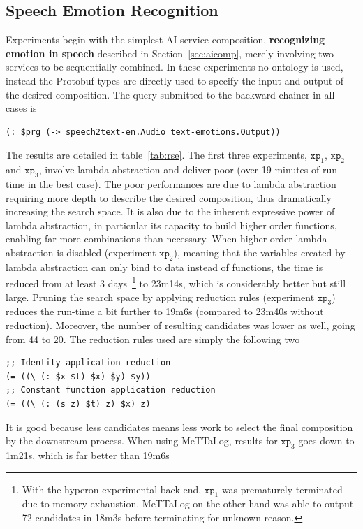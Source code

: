 \documentclass[]{report}
\begin{document}
\subsection{Speech Emotion Recognition}
Experiments begin with the simplest AI service composition,
\textbf{recognizing emotion in speech} described in
Section~\ref{sec:aicomp}, merely involving two services to be
sequentially combined.  In these experiments no ontology is used,
instead the Protobuf types are directly used to specify the input and
output of the desired composition.  The query submitted to the
backward chainer in all cases is
\begin{verbatim}
(: $prg (-> speech2text-en.Audio text-emotions.Output))
\end{verbatim}
The results are detailed in table~\ref{tab:rse}.  The first three
experiments, $\texttt{xp}_1$, $\texttt{xp}_2$ and $\texttt{xp}_3$,
involve lambda abstraction and deliver poor (over 19 minutes of
run-time in the best case).  The poor performances are due to lambda
abstraction requiring more depth to describe the desired composition,
thus dramatically increasing the search space.  It is also due to the
inherent expressive power of lambda abstraction, in particular its
capacity to build higher order functions, enabling far more
combinations than necessary.  When higher order lambda abstraction is
disabled (experiment $\texttt{xp}_2$), meaning that the variables
created by lambda abstraction can only bind to data instead of
functions, the time is reduced from at least 3 days~\footnote{With the
hyperon-experimental back-end, $\texttt{xp}_1$ was prematurely
terminated due to memory exhaustion.  MeTTaLog on the other hand was
able to output 72 candidates in 18m3s before terminating for unknown
reason.} to 23m14s, which is considerably better but still large.
Pruning the search space by applying reduction rules (experiment
$\texttt{xp}_3$) reduces the run-time a bit further to 19m6s (compared
to 23m40s without reduction).  Moreover, the number of resulting
candidates was lower as well, going from 44 to 20.  The reduction
rules used are simply the following two
\begin{verbatim}
;; Identity application reduction
(= ((\ (: $x $t) $x) $y) $y))
;; Constant function application reduction
(= ((\ (: (s z) $t) z) $x) z)
\end{verbatim}
It is good because less candidates means less work to select the final
composition by the downstream process.  When using MeTTaLog, results
for $\texttt{xp}_3$ goes down to 1m21s, which is far better than 19m6s
\end{document}
